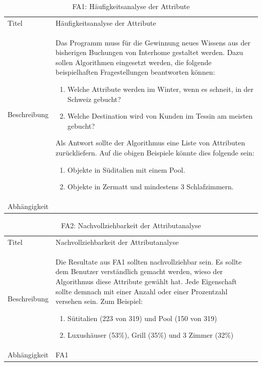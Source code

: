 \begin{table}[H] 
	\caption{FA1: Häufigkeitsanalyse der Attribute}
	\centering
	\label{fig:anforderungsanalyse:funktionaleanforderung:fa1}
	\begin{tabular}{ | l | L{10cm} | } 
		\hline 
		 \\ \hline 
		Titel & Häufigkeitsanalyse der Attribute \\ \hline 
		Beschreibung & Das Programm muss für die Gewinnung neues Wissens aus der bisherigen Buchungen von Interhome gestaltet werden. Dazu sollen Algorithmen eingesetzt werden, die folgende beispielhaften Fragestellungen beantworten können:
		\begin{enumerate}
		\item Welche Attribute werden im Winter, wenn es schneit, in der Schweiz gebucht?
		\item Welche Destination wird von Kunden im Tessin am meisten gebucht?
		\end{enumerate}
		
		Als Antwort sollte der Algorithmus eine Liste von Attributen zurückliefern. Auf die obigen Beispiele könnte dies folgende sein: 
		\begin{enumerate}
		\item Objekte in Süditalien mit einem Pool.
		\item Objekte in Zermatt und mindestens 3 Schlafzimmern.
		\end{enumerate} \\ \hline 
		Abhängigkeit & \\ \hline 
	\end{tabular}
\end{table}

\begin{table}[H] 
	\caption{FA2: Nachvollziehbarkeit der Attributanalyse}
	\centering
	\label{fig:anforderungsanalyse:funktionaleanforderung:fa2}
	\begin{tabular}{ | l | L{10cm} | } 
		\hline 
		 \\ \hline 
		Titel & Nachvollziehbarkeit der Attributanalyse \\ \hline 
		Beschreibung & Die Resultate aus FA1 sollten nachvollziehbar sein. Es sollte dem Benutzer verständlich gemacht werden, wieso der Algorithmus diese Attribute gewählt hat. Jede Eigenschaft sollte demnach mit einer Anzahl oder einer Prozentzahl versehen sein. Zum Beispiel:
			\begin{enumerate}
			\item Sütitalien (223 von 319) und Pool (150 von 319)
			\item Luxushäuser (53\%), Grill (35\%) und 3 Zimmer (32\%)
			\end{enumerate} \\ \hline 
		Abhängigkeit & FA1 \\ \hline 
	\end{tabular}
\end{table}

